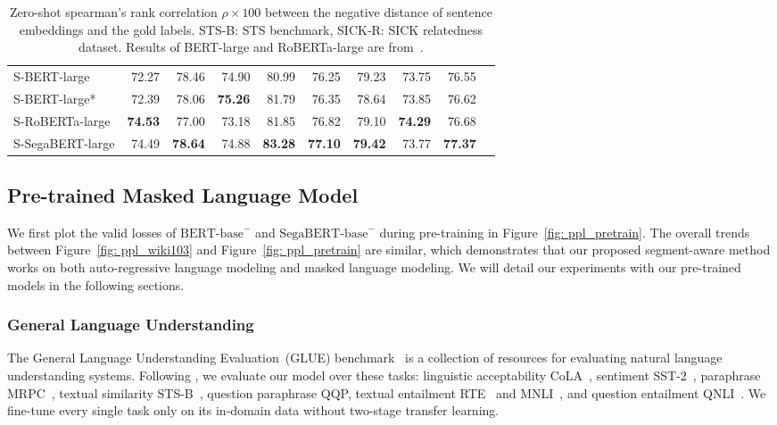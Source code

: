 \documentclass[letterpaper]{article}
\begin{document}
\begin{table*}[ht!]
\begin{tabular}{lrrrrrrrrr}
  S-BERT-large &72.27 &78.46 &74.90 &80.99 &76.25 &79.23 &73.75 &76.55 \\
  S-BERT-large* &72.39 &78.06 &\textbf{75.26} &81.79 &76.35 &78.64 &73.85 &76.62 \\
  S-RoBERTa-large &\textbf{74.53} &77.00 &73.18 &81.85 &76.82 &79.10 &\textbf{74.29} &76.68 \\
  \hline
  S-SegaBERT-large &74.49 &\textbf{78.64} &74.88 &\textbf{83.28} &\textbf{77.10} &\textbf{79.42} &73.77 &\textbf{77.37} \\  \bottomrule
  \end{tabular}
  \caption{Zero-shot spearman's rank correlation $\rho\times 100$ between the negative distance of sentence embeddings and the gold labels. STS-B: STS benchmark, SICK-R: SICK relatedness dataset. Results of BERT-large and RoBERTa-large are from~\citet{DBLP:conf/emnlp/sbert}.}\label{tab: sts-zeroshot}
  \scriptsize
  \end{table*} 

\subsection{Pre-trained Masked Language Model}
We first plot the valid losses of $\text{BERT-base}^{-}$ and $\text{SegaBERT-base}^{-}$ during pre-training in Figure~\ref{fig: ppl_pretrain}.
The overall trends between Figure~\ref{fig: ppl_wiki103} and Figure~\ref{fig: ppl_pretrain} are similar, which demonstrates that our proposed segment-aware method works on both auto-regressive language modeling and masked language modeling.
We will detail our experiments with our pre-trained models in the following sections.

\subsubsection{General Language Understanding}
The General Language Understanding Evaluation~(GLUE) benchmark~\cite{DBLP:conf/iclr/glue} is a collection of resources for evaluating natural language understanding systems. 
Following \citet{DBLP:journals/corr/bert}, we evaluate our model over these tasks: linguistic acceptability CoLA~\cite{cola}, sentiment SST-2~\cite{sst2}, paraphrase MRPC~\cite{mrpc}, textual similarity STS-B~\cite{sts-b}, question paraphrase QQP, textual entailment RTE~\cite{rte} and MNLI~\cite{mnli}, and question entailment QNLI~\cite{DBLP:conf/iclr/glue}. 
We fine-tune every single task only on its in-domain data without two-stage transfer learning.
\end{document}
